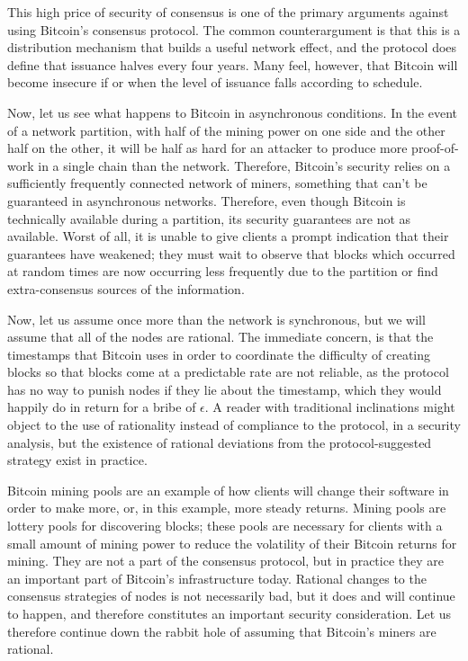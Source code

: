\documentclass[11pt,a4paper]{article}
\theoremstyle{plain}
\theoremstyle{definition}
\begin{document}
This high price of security of consensus is one of the primary arguments against using Bitcoin's consensus protocol. The common counterargument is that this is a distribution mechanism that builds a useful network effect, and the protocol does define that issuance halves every four years. Many feel, however, that Bitcoin will become insecure if or when the level of issuance falls according to schedule.

Now, let us see what happens to Bitcoin in asynchronous conditions. In the event of a network partition, with half of the mining power on one side and the other half on the other, it will be half as hard for an attacker to produce more proof-of-work in a single chain than the network. Therefore, Bitcoin's security relies on a sufficiently frequently connected network of miners, something that can't be guaranteed in asynchronous networks. Therefore, even though Bitcoin is technically available during a partition, its security guarantees are not as available. Worst of all, it is unable to give clients a prompt indication that their guarantees have weakened; they must wait to observe that blocks which occurred at random times are now occurring less frequently due to the partition or find extra-consensus sources of the information.

Now, let us assume once more than the network is synchronous, but we will assume that all of the nodes are rational. The immediate concern, is that the timestamps that Bitcoin uses in order to coordinate the difficulty of creating blocks so that blocks come at a predictable rate are not reliable, as the protocol has no way to punish nodes if they lie about the timestamp, which they would happily do in return for a bribe of $\epsilon$. A reader with traditional inclinations might object to the use of rationality instead of compliance to the protocol, in a security analysis, but the existence of rational deviations from the protocol-suggested strategy exist in practice.

Bitcoin mining pools are an example of how clients will change their software in order to make more, or, in this example, more steady returns. Mining pools are lottery pools for discovering blocks; these pools are necessary for clients with a small amount of mining power to reduce the volatility of their Bitcoin returns for mining. They are not a part of the consensus protocol, but in practice they are an important part of Bitcoin's infrastructure today. Rational changes to the consensus strategies of nodes is not necessarily bad, but it does and will continue to happen, and therefore constitutes an important security consideration. Let us therefore continue down the rabbit hole of assuming that Bitcoin's miners are rational.
\end{document}
